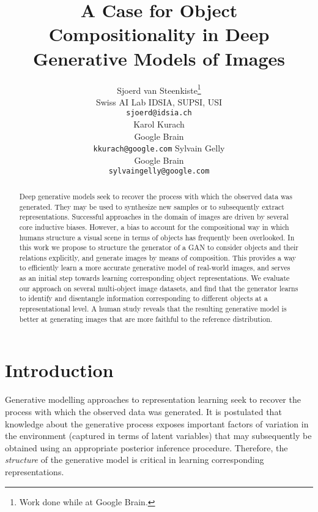 \documentclass{article}
\title{A Case for Object Compositionality in Deep Generative Models of Images}
\author{%
Sjoerd van Steenkiste\thanks{Work done while at Google Brain.} \\
Swiss AI Lab IDSIA, SUPSI, USI\\
{\footnotesize\texttt{sjoerd@idsia.ch}} \\
\And
Karol Kurach \\
Google Brain \\
{\footnotesize\texttt{kkurach@google.com}}
\And
Sylvain Gelly \\
Google Brain \\
{\footnotesize\texttt{sylvaingelly@google.com}}
}
\begin{document}
\maketitle


\begin{abstract}
Deep generative models seek to recover the process with which the observed data was generated.
They may be used to synthesize new samples or to subsequently extract representations.
Successful approaches in the domain of images are driven by several core inductive biases.
However, a bias to account for the compositional way in which humans structure a visual scene in terms of objects has frequently been overlooked.
In this work we propose to structure the generator of a GAN to consider objects and their relations explicitly, and generate images by means of composition.
This provides a way to efficiently learn a more accurate generative model of real-world images, and serves as an initial step towards learning corresponding object representations.
We evaluate our approach on several multi-object image datasets, and find that the generator learns to identify and disentangle information corresponding to different objects at a representational level.
A human study reveals that the resulting generative model is better at generating images that are more faithful to the reference distribution.
\end{abstract}

\section{Introduction}
Generative modelling approaches to representation learning seek to recover the process with which the observed data was generated.  %
It is postulated that knowledge about the generative process exposes important factors of variation in the environment (captured in terms of latent variables) that may subsequently be obtained using an appropriate posterior inference procedure.
Therefore, the \emph{structure} of the generative model is critical in learning corresponding representations.
\end{document}
